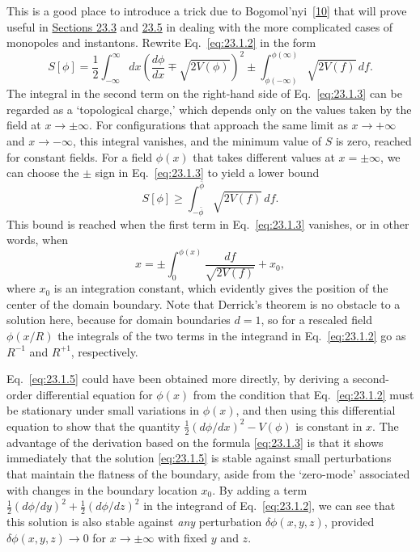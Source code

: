 This is a good place to introduce a trick due to
Bogomol'nyi~\hyperref[ch23-ref-10]{[10]} that will prove useful in
\hyperref[sec:23.3]{Sections 23.3} and \hyperref[sec:23.5]{23.5} in dealing
with the more complicated cases of monopoles and instantons. Rewrite
Eq.~\eqref{eq:23.1.2} in the form
\begin{equation}
 S[\phi]=\frac{1}{2}\int_{-\infty}^{\infty}dx
 \left(\frac{d\phi}{dx}\mp\sqrt{2V(\phi)}\right)^2
 \mathbin{\pm}\int_{\phi(-\infty)}^{\phi(\infty)}
 \sqrt{2V(f)}\,df.
 \tag{23.1.3}\label{eq:23.1.3}
\end{equation}
The integral in the second term on the right-hand side of
Eq.~\eqref{eq:23.1.3} can be regarded as a `topological charge,' which
depends only on the values taken by the field at $x\to\pm\infty$. For
configurations that approach the same limit as $x\to+\infty$ and
$x\to-\infty$, this integral vanishes, and the minimum value of $S$ is zero,
reached for constant fields. For a field $\phi(x)$ that takes different
values at $x=\pm\infty$, we can choose the $\pm$ sign in
Eq.~\eqref{eq:23.1.3} to yield a lower bound
\begin{equation}
 S[\phi]\geq\int_{-\bar\phi}^{\bar\phi}\sqrt{2V(f)}\,df.
 \tag{23.1.4}\label{eq:23.1.4}
\end{equation}
This bound is reached when the first term in Eq.~\eqref{eq:23.1.3}
vanishes, or in other words, when
\begin{equation}
 x=\mathbin{\pm}\int_0^{\phi(x)}
 \frac{df}{\sqrt{2V(f)}}+x_0,
 \tag{23.1.5}\label{eq:23.1.5}
\end{equation}
where $x_0$ is an integration constant, which evidently gives the position
of the center of the domain boundary. Note that Derrick's theorem is no
obstacle to a solution here, because for domain boundaries $d=1$, so for a
rescaled field $\phi(x/R)$ the integrals of the two terms in the integrand
in Eq.~\eqref{eq:23.1.2} go as $R^{-1}$ and $R^{+1}$, respectively.

Eq.~\eqref{eq:23.1.5} could have been obtained more directly, by deriving a
second-order differential equation for $\phi(x)$ from the condition that
Eq.~\eqref{eq:23.1.2} must be stationary under small variations in
$\phi(x)$, and then using this differential equation to show that the
quantity $\frac{1}{2}(d\phi/dx)^2-V(\phi)$ is constant in $x$. The advantage
of the derivation based on the formula \eqref{eq:23.1.3} is that it shows
immediately that the solution \eqref{eq:23.1.5} is stable against small
perturbations that maintain the flatness of the boundary, aside from the
`zero-mode' associated with changes in the boundary location $x_0$. By
adding a term
$\frac{1}{2}(d\phi/dy)^2+\frac{1}{2}(d\phi/dz)^2$ in the integrand of
Eq.~\eqref{eq:23.1.2}, we can see that this solution is also stable against
\emph{any} perturbation $\delta\phi(x,y,z)$, provided
$\delta\phi(x,y,z)\to0$ for $x\to\pm\infty$ with fixed $y$ and $z$.

